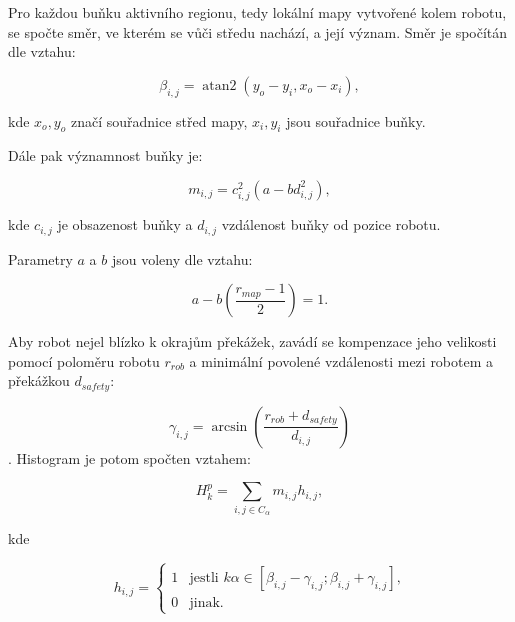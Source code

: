 \documentclass[twoside]{ctuthesis}
\theoremstyle{plain}
\theoremstyle{definition}
\theoremstyle{note}
\DeclareMathOperator{\atantwo}{atan2}
\begin{document}
Pro každou buňku aktivního regionu, tedy lokální mapy vytvořené kolem robotu, se spočte směr, ve kterém se vůči středu nachází, a její význam.
Směr je spočítán dle vztahu:

\begin{equation}
\beta_{i,j} = 	\atantwo ( y_o - y_i, x_o - x_i),
\end{equation}

kde $x_o, y_o$ značí souřadnice střed mapy, $x_i, y_i$ jsou souřadnice buňky.

Dále pak významnost buňky je:

\begin{equation}
m_{i,j} = c_{i,j}^2(a - bd_{i,j}^2),
\end{equation}

kde $c_{i,j}$ je obsazenost buňky a $d_{i,j}$ vzdálenost buňky od pozice robotu.

Parametry $a$ a $b$ jsou voleny dle vztahu:

\begin{equation}
a - b\left(\frac{r_{map} - 1}{2}\right)   = 1.
\end{equation}


Aby robot nejel blízko k okrajům překážek, zavádí se kompenzace jeho velikosti pomocí poloměru robotu $r_{rob}$ a minimální povolené vzdálenosti mezi robotem a překážkou $d_{safety}$:

$$\gamma_{i,j} = \arcsin\left(\frac{r_{rob} + d_{safety}}{d_{i,j}}\right)$$.
Histogram je potom spočten vztahem:

\begin{equation}
H_k^p = \sum_{i,j \in C_{\alpha} } m_{i,j}h_{i,j},
\end{equation}

kde

\begin{equation}
h_{i,j} = \left\{
\begin{array}{ll}
1&\textrm{jestli $k\alpha \in \left[\beta_{i,j} - \gamma_{i,j}; \beta_{i,j} + \gamma_{i,j}\right]$,} \\
0&\textrm{jinak.}
\end{array}
\right.
\end{equation}
\end{document}
